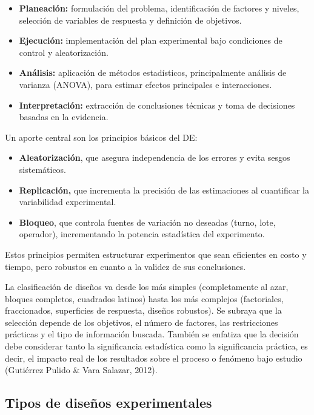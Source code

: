 \documentclass[
  spanish,
  letterpaper,
  DIV=11,
  numbers=noendperiod]{scrreprt}
\providecommand{\tightlist}{%
  \setlength{\itemsep}{0pt}\setlength{\parskip}{0pt}}
\begin{document}
\begin{itemize}
\tightlist
\item
  \textbf{Planeación:} formulación del problema, identificación de
  factores y niveles, selección de variables de respuesta y definición
  de objetivos.
\item
  \textbf{Ejecución:} implementación del plan experimental bajo
  condiciones de control y aleatorización.
\item
  \textbf{Análisis:} aplicación de métodos estadísticos, principalmente
  análisis de varianza (ANOVA), para estimar efectos principales e
  interacciones.
\item
  \textbf{Interpretación:} extracción de conclusiones técnicas y toma de
  decisiones basadas en la evidencia.
\end{itemize}

Un aporte central son los principios básicos del DE:

\begin{itemize}
\tightlist
\item
  \textbf{Aleatorización}, que asegura independencia de los errores y
  evita sesgos sistemáticos.
\item
  \textbf{Replicación,} que incrementa la precisión de las estimaciones
  al cuantificar la variabilidad experimental.
\item
  \textbf{Bloqueo}, que controla fuentes de variación no deseadas
  (turno, lote, operador), incrementando la potencia estadística del
  experimento.
\end{itemize}

Estos principios permiten estructurar experimentos que sean eficientes
en costo y tiempo, pero robustos en cuanto a la validez de sus
conclusiones.

La clasificación de diseños va desde los más simples (completamente al
azar, bloques completos, cuadrados latinos) hasta los más complejos
(factoriales, fraccionados, superficies de respuesta, diseños robustos).
Se subraya que la selección depende de los objetivos, el número de
factores, las restricciones prácticas y el tipo de información buscada.
También se enfatiza que la decisión debe considerar tanto la
significancia estadística como la significancia práctica, es decir, el
impacto real de los resultados sobre el proceso o fenómeno bajo estudio
(Gutiérrez Pulido \& Vara Salazar, 2012).

\subsection{Tipos de diseños
experimentales}\label{tipos-de-diseuxf1os-experimentales}
\end{document}
